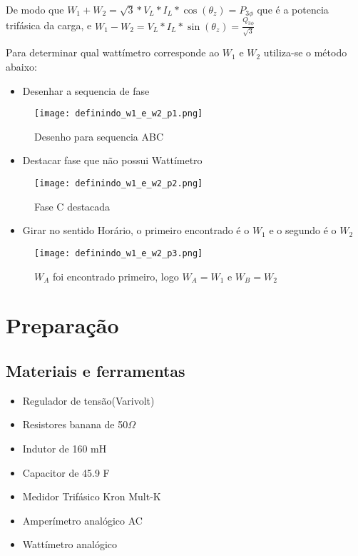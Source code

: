 \documentclass[a4paper, 12pt]{article}
\begin{document}
De modo que $W_1 + W_2 = \sqrt{3}*V_L*I_L*\cos(\theta_z) =P_{3\phi} $ que é a potencia trifásica da carga, e $W_1 - W_2 = V_L*I_L*\sin(\theta_z) = \frac{Q_{3\phi}}{\sqrt{3}}$

Para determinar qual wattímetro corresponde ao $W_1$ e $W_2$ utiliza-se o método abaixo:
\newpage
\begin{itemize}
            \item Desenhar a sequencia de fase
        \end{itemize}
        \begin{figure}[H]
             \centering %
            \texttt{[image: definindo\_w1\_e\_w2\_p1.png]}
            \caption{Desenho para sequencia ABC}
        \end{figure}
        \begin{itemize}
            \item Destacar fase que não possui Wattímetro
        \end{itemize}
        \begin{figure}[H]
             \centering %
            \texttt{[image: definindo\_w1\_e\_w2\_p2.png]}
            \caption{Fase C destacada}
        \end{figure}

        \newpage
        \begin{itemize}
            \item Girar no sentido Horário, o primeiro encontrado é o $W_1$ e o segundo é o $W_2$
        \end{itemize}
        \begin{figure}[H]
             \centering %
            \texttt{[image: definindo\_w1\_e\_w2\_p3.png]}
            \caption{$W_A$ foi encontrado primeiro, logo $W_A = W_1$ e $W_B = W_2$}
        \end{figure}
\newpage
\section{Preparação}
    \subsection{Materiais e ferramentas}
        \begin{itemize}
            \item Regulador de tensão(Varivolt)
            \item Resistores banana de 50\(\Omega\)
            \item Indutor de 160 mH
            \item Capacitor de 45.9 \si{\micro}F
            \item Medidor Trifásico Kron Mult-K
            \item Amperímetro analógico AC
            \item Wattímetro analógico
        \end{itemize}
\end{document}
